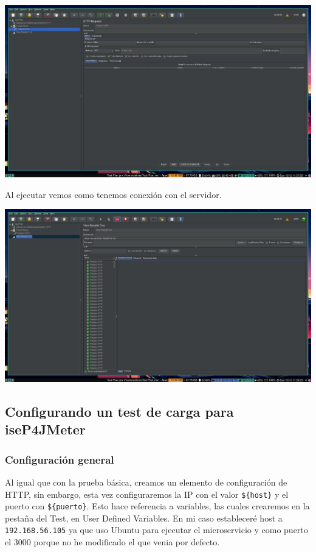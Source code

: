 \documentclass[12pt, spanish]{article}
\begin{document}
\begin{center}
\includegraphics[scale=0.25]{jmeter_basico.png}
\end{center}

\newpage

Al ejecutar vemos como tenemos conexión con el servidor.

\begin{center}
\includegraphics[scale=0.25]{jmeter_p_basico.png}
\end{center}


\newpage

\subsection{Configurando un test de carga para iseP4JMeter}

\subsubsection{Configuración general}

Al igual que con la prueba básica, creamos un elemento de configuración de HTTP, sin embargo, esta vez configuraremos la IP con el valor \texttt{\$\{host\}} y el puerto con \texttt{\$\{puerto\}}. Esto hace referencia a variables, las cuales crearemos en la pestaña del Test, en User Defined Variables. En mi caso estableceré host a \texttt{192.168.56.105} ya que uso Ubuntu para ejecutar el microservicio y como puerto el 3000 porque no he modificado el que venia por defecto.
\end{document}
